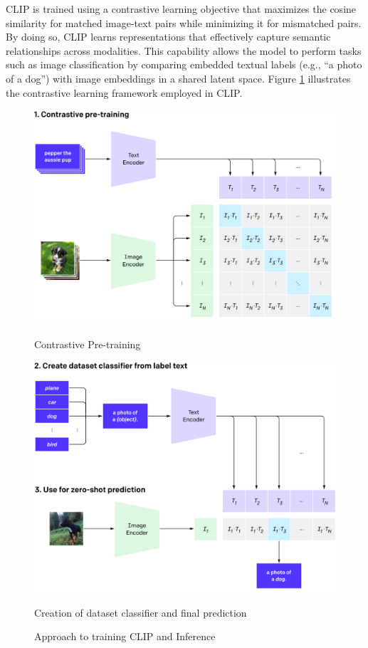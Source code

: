 CLIP is trained using a contrastive learning objective that maximizes the cosine similarity for matched image-text pairs while minimizing it for mismatched pairs. By doing so, CLIP learns representations that effectively capture semantic relationships across modalities. This capability allows the model to perform tasks such as image classification by comparing embedded textual labels (e.g., “a photo of a dog”) with image embeddings in a shared latent space. Figure \ref{fig:sidebyside} illustrates the contrastive learning framework employed in CLIP.
\newline

\begin{figure}[h]
\centering
\begin{minipage}[b]{0.45\textwidth}
\includegraphics[width=\textwidth]{images/overview-a-clip.png}
\caption{Contrastive Pre-training}
\label{fig:contrastive_loss }
\end{minipage}
\hfill
\begin{minipage}[b]{0.45\textwidth}
\includegraphics[width=\textwidth]{images/overview-b-clip.png}
\caption{Creation of dataset classifier and final prediction}
\label{fig:clip_zero }
\end{minipage}
\caption{Approach to training CLIP and Inference \cite{radford2021learningtransferablevisualmodels}}
\label{fig:sidebyside}
\end{figure}

